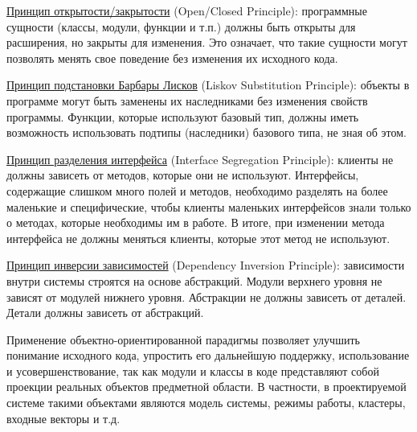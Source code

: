\uline{Принцип открытости/закрытости} (Open/Closed Principle): программные сущности (классы, модули, функции и т.п.) должны быть открыты для расширения, но закрыты для изменения. Это означает, что такие сущности могут позволять менять свое поведение без изменения их исходного кода.

\uline{Принцип подстановки Барбары Лисков} (Liskov Substitution Principle): объекты в программе могут быть заменены их наследниками без изменения свойств программы. Функции, которые используют базовый тип, должны иметь возможность использовать подтипы (наследники) базового типа, не зная об этом.

\uline{Принцип разделения интерфейса} (Interface Segregation Principle): клиенты не должны зависеть от методов, которые они не используют. Интерфейсы, содержащие слишком много полей и методов, необходимо разделять на более маленькие и специфические, чтобы клиенты маленьких интерфейсов знали только о методах, которые необходимы им в работе. В итоге, при изменении метода интерфейса не должны меняться клиенты, которые этот метод не используют.

\uline{Принцип инверсии зависимостей} (Dependency Inversion Principle): зависимости внутри системы строятся на основе абстракций. Модули верхнего уровня не зависят от модулей нижнего уровня. Абстракции не должны зависеть от деталей. Детали должны зависеть от абстракций.~\cite{RMartinAgile}

Применение объектно-ориентированной парадигмы позволяет улучшить понимание исходного кода, упростить его дальнейшую поддержку, использование и усовершенствование, так как модули и классы в коде представляют собой проекции реальных объектов предметной области. В частности, в проектируемой системе такими объектами являются модель системы, режимы работы, кластеры, входные векторы и т.д.